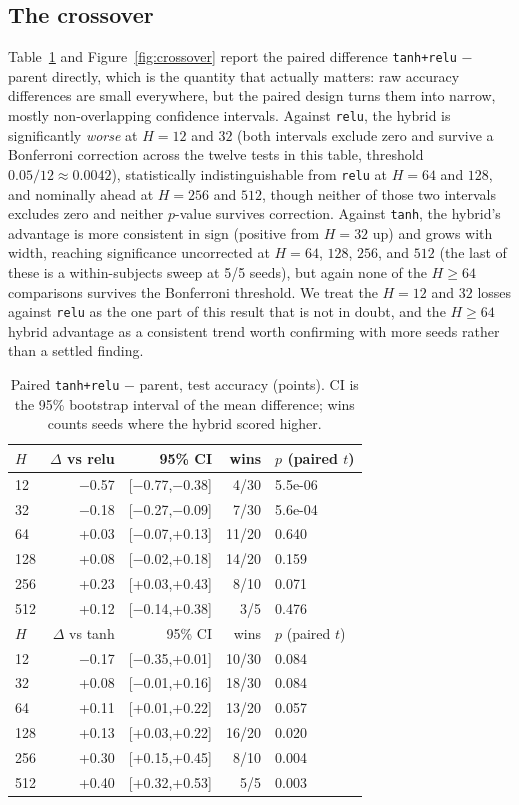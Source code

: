\documentclass[9pt]{extarticle}
\begin{document}
\subsection{The crossover}
Table~\ref{tab:crossover} and Figure~\ref{fig:crossover} report the paired
difference \texttt{tanh+relu} $-$ parent directly, which is the quantity that
actually matters: raw accuracy differences are small everywhere, but the
paired design turns them into narrow, mostly non-overlapping confidence
intervals. Against \texttt{relu}, the hybrid is significantly \emph{worse} at
\(H{=}12\) and \(32\) (both intervals exclude zero and survive a Bonferroni
correction across the twelve tests in this table, threshold
\(0.05/12 \approx 0.0042\)), statistically indistinguishable from \texttt{relu}
at \(H{=}64\) and \(128\), and nominally ahead at \(H{=}256\) and \(512\), though
neither of those two intervals excludes zero and neither $p$-value survives
correction. Against \texttt{tanh}, the hybrid's advantage is more consistent
in sign (positive from \(H{=}32\) up) and grows with width, reaching
significance uncorrected at \(H{=}64\), \(128\), \(256\), and \(512\) (the
last of these is a within-subjects sweep at 5/5 seeds), but again none of the
\(H\geq 64\) comparisons survives the Bonferroni threshold. We treat the
\(H{=}12\) and \(32\) losses against \texttt{relu} as the one part of this
result that is not in doubt, and the \(H\geq 64\) hybrid advantage as a
consistent trend worth confirming with more seeds rather than a settled
finding.

\begin{table}[t]
\centering\small
\caption{Paired \texttt{tanh+relu} $-$ parent, test accuracy (points). CI is
the 95\% bootstrap interval of the mean difference; wins counts seeds where
the hybrid scored higher.}
\label{tab:crossover}
\begin{tabular}{@{}lrrrl@{}}
\toprule
$H$ & $\Delta$ vs relu & 95\% CI & wins & $p$ (paired $t$) \\
\midrule
12  & $-$0.57 & [$-$0.77,$-$0.38] & 4/30 & 5.5e-06 \\
32  & $-$0.18 & [$-$0.27,$-$0.09] & 7/30 & 5.6e-04 \\
64  & +0.03 & [$-$0.07,+0.13] & 11/20 & 0.640 \\
128 & +0.08 & [$-$0.02,+0.18] & 14/20 & 0.159 \\
256 & +0.23 & [+0.03,+0.43] & 8/10 & 0.071 \\
512 & +0.12 & [$-$0.14,+0.38] & 3/5 & 0.476 \\
\midrule
$H$ & $\Delta$ vs tanh & 95\% CI & wins & $p$ (paired $t$) \\
\midrule
12  & $-$0.17 & [$-$0.35,+0.01] & 10/30 & 0.084 \\
32  & +0.08 & [$-$0.01,+0.16] & 18/30 & 0.084 \\
64  & +0.11 & [+0.01,+0.22] & 13/20 & 0.057 \\
128 & +0.13 & [+0.03,+0.22] & 16/20 & 0.020 \\
256 & +0.30 & [+0.15,+0.45] & 8/10 & 0.004 \\
512 & +0.40 & [+0.32,+0.53] & 5/5 & 0.003 \\
\bottomrule
\end{tabular}
\end{table}
\end{document}
